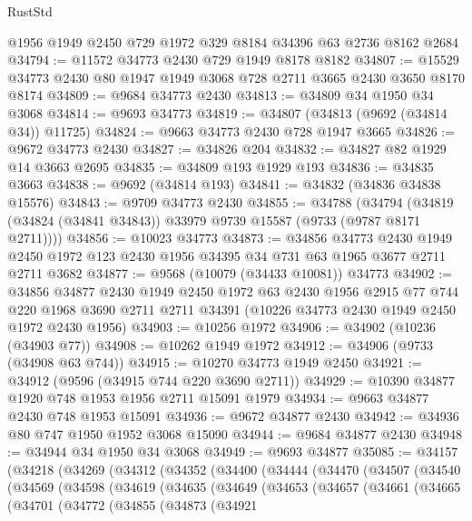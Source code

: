 \begin{lexlean}{RustStd}
\begin{coremodule}
{\begin{coremodule}
{{{{{{{{{{{{{{{{{{{{{{{{{{{{{{{{{{{{{{{{{{{{{{{{{{{{{{{    @1956
    @1949
    @2450
    @729
    @1972
    @329
    @8184
    @34396
    @63
    @2736
    @8162
    @2684
@34794 := @11572 @34773 @2430 @729 @1949 @8178 @8182
@34807 := @15529 @34773 @2430 @80 @1947 @1949 @3068 @728 @2711 @3665 @2430 @3650 @8170 @8174
@34809 := @9684 @34773 @2430
@34813 := @34809 @34 @1950 @34 @3068
@34814 := @9693 @34773
@34819 := @34807 (@34813 (@9692 (@34814 @34)) @11725)
@34824 := @9663 @34773 @2430 @728 @1947 @3665
@34826 := @9672 @34773 @2430
@34827 := @34826 @204
@34832 := @34827 @82 @1929 @14 @3663 @2695
@34835 := @34809 @193 @1929 @193
@34836 := @34835 @3663
@34838 := @9692 (@34814 @193)
@34841 := @34832 (@34836 @34838 @15576)
@34843 := @9709 @34773 @2430
@34855 := @34788
    (@34794 (@34819 (@34824 (@34841 @34843)) @33979 @9739 @15587 (@9733 (@9787 @8171 @2711))))
@34856 := @10023 @34773
@34873 := @34856
    @34773
    @2430
    @1949
    @2450
    @1972
    @123
    @2430
    @1956
    @34395
    @34
    @731
    @63
    @1965
    @3677
    @2711
    @2711
    @3682
@34877 := @9568 (@10079 (@34433 @10081)) @34773
@34902 := @34856
    @34877
    @2430
    @1949
    @2450
    @1972
    @63
    @2430
    @1956
    @2915
    @77
    @744
    @220
    @1968
    @3690
    @2711
    @2711
    @34391
    (@10226 @34773 @2430 @1949 @2450 @1972 @2430 @1956)
@34903 := @10256 @1972
@34906 := @34902 (@10236 (@34903 @77))
@34908 := @10262 @1949 @1972
@34912 := @34906 (@9733 (@34908 @63 @744))
@34915 := @10270 @34773 @1949 @2450
@34921 := @34912 (@9596 (@34915 @744 @220 @3690 @2711))
@34929 := @10390 @34877 @1920 @748 @1953 @1956 @2711 @15091 @1979
@34934 := @9663 @34877 @2430 @748 @1953 @15091
@34936 := @9672 @34877 @2430
@34942 := @34936 @80 @747 @1950 @1952 @3068 @15090
@34944 := @9684 @34877 @2430
@34948 := @34944 @34 @1950 @34 @3068
@34949 := @9693 @34877
@35085 := @34157
    (@34218
      (@34269
        (@34312
          (@34352
            (@34400
              (@34444
                (@34470
                  (@34507
                    (@34540
                      (@34569
                        (@34598
                          (@34619
                            (@34635
                              (@34649
                                (@34653
                                  (@34657
                                    (@34661
                                      (@34665
                                        (@34701
                                          (@34772
                                            (@34855
                                              (@34873
                                                (@34921
}}}}}}}}}}}}}}}}}}}}}}}}}}}}}}}}}}}}}}}}}}}}}}}}}}}}}}}
\end{coremodule}}
\end{coremodule}
\end{lexlean}
